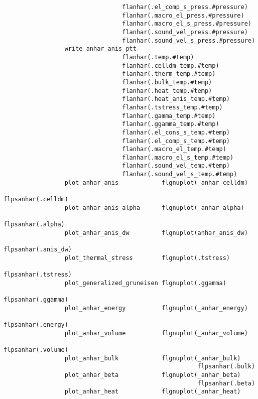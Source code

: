 \documentclass[12pt,a4paper,twoside]{report}
\begin{document}
\begin{footnotesize}
\begin{verbatim}
                                 flanhar(.el_comp_s_press.#pressure)
                                 flanhar(.macro_el_press.#pressure)
                                 flanhar(.macro_el_s_press.#pressure)
                                 flanhar(.sound_vel_press.#pressure)
                                 flanhar(.sound_vel_s_press.#pressure)
                 write_anhar_anis_ptt
                                 flanhar(.temp.#temp)
                                 flanhar(.celldm_temp.#temp)
                                 flanhar(.therm_temp.#temp)
                                 flanhar(.bulk_temp.#temp)
                                 flanhar(.heat_temp.#temp)
                                 flanhar(.heat_anis_temp.#temp)
                                 flanhar(.tstress_temp.#temp)
                                 flanhar(.gamma_temp.#temp)
                                 flanhar(.ggamma_temp.#temp)
                                 flanhar(.el_cons_s_temp.#temp)
                                 flanhar(.el_comp_s_temp.#temp)
                                 flanhar(.macro_el_temp.#temp)
                                 flanhar(.macro_el_s_temp.#temp)
                                 flanhar(.sound_vel_temp.#temp)
                                 flanhar(.sound_vel_s_temp.#temp)
                 plot_anhar_anis            flgnuplot(_anhar_celldm)   
                                                        flpsanhar(.celldm)
                 plot_anhar_anis_alpha      flgnuplot(_anhar_alpha)   
                                                        flpsanhar(.alpha)
                 plot_anhar_anis_dw         flgnuplot(anhar_anis_dw) 
                                                        flpsanhar(.anis_dw)
                 plot_thermal_stress        flgnuplot(.tstress)  
                                                        flpsanhar(.tstress)
                 plot_generalized_gruneisen flgnuplot(.ggamma)  
                                                        flpsanhar(.ggamma)
                 plot_anhar_energy          flgnuplot(_anhar_energy) 
                                                      flpsanhar(.energy)
                 plot_anhar_volume          flgnuplot(_anhar_volume) 
                                                      flpsanhar(.volume)
                 plot_anhar_bulk            flgnuplot(_anhar_bulk) 
                                                      flpsanhar(.bulk)
                 plot_anhar_beta            flgnuplot(_anhar_beta) 
                                                      flpsanhar(.beta)
                 plot_anhar_heat            flgnuplot(_anhar_heat) 

\end{verbatim}
\end{footnotesize}
\end{document}
